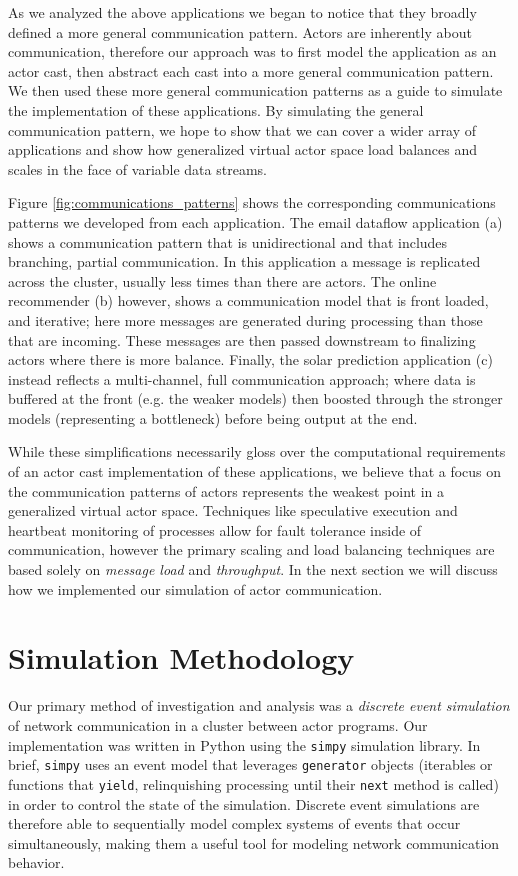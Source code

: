 \documentclass[conference,twocolumn,10pt]{IEEEtran}
\begin{document}
As we analyzed the above applications we began to notice that they broadly defined a more general communication pattern. Actors are inherently about communication, therefore our approach was to first model the application as an actor cast, then abstract each cast into a more general communication pattern. We then used these more general communication patterns as a guide to simulate the implementation of these applications. By simulating the general communication pattern, we hope to show that we can cover a wider array of applications and show how generalized virtual actor space load balances and scales in the face of variable data streams.

Figure \ref{fig:communications_patterns} shows the corresponding communications patterns we developed from each application. The email dataflow application (a) shows a communication pattern that is unidirectional and that includes branching, partial communication. In this application a message is replicated across the cluster, usually less times than there are actors. The online recommender (b) however, shows a communication model that is front loaded, and iterative; here more messages are generated during processing than those that are incoming. These messages are then passed downstream to finalizing actors where there is more balance. Finally, the solar prediction application (c) instead reflects a multi-channel, full communication approach; where data is buffered at the front (e.g. the weaker models) then boosted through the stronger models (representing a bottleneck) before being output at the end.

While these simplifications necessarily gloss over the computational requirements of an actor cast implementation of these applications, we believe that a focus on the communication patterns of actors represents the weakest point in a generalized virtual actor space. Techniques like speculative execution and heartbeat monitoring of processes allow for fault tolerance inside of communication, however the primary scaling and load balancing techniques are based solely on \textit{message load} and \textit{throughput}. In the next section we will discuss how we implemented our simulation of actor communication.

\section{Simulation Methodology}

Our primary method of investigation and analysis was a \textit{discrete event simulation} of network communication in a cluster between actor programs. Our implementation was written in Python using the \texttt{simpy} \cite{matloff_introduction_2008} simulation library. In brief, \texttt{simpy} uses an event model that leverages \texttt{generator} objects (iterables or functions that \texttt{yield}, relinquishing processing until their \texttt{next} method is called) in order to control the state of the simulation. Discrete event simulations are therefore able to sequentially model complex systems of events that occur simultaneously, making them a useful tool for modeling network communication behavior.
\end{document}
